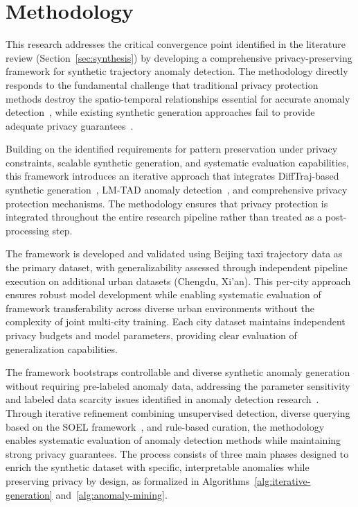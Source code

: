 \section{Methodology}
\label{sec:methodology}

This research addresses the critical convergence point identified in the literature review (Section~\ref{sec:synthesis}) by developing a comprehensive privacy-preserving framework for synthetic trajectory anomaly detection. The methodology directly responds to the fundamental challenge that traditional privacy protection methods destroy the spatio-temporal relationships essential for accurate anomaly detection~\cite{buchholzSystematisationKnowledgeTrajectory2024}, while existing synthetic generation approaches fail to provide adequate privacy guarantees~\cite{liuTrajGANsUsingGenerative2018}.

Building on the identified requirements for pattern preservation under privacy constraints, scalable synthetic generation, and systematic evaluation capabilities, this framework introduces an iterative approach that integrates DiffTraj-based synthetic generation~\cite{zhuDiffTrajGeneratingGPS2023}, LM-TAD anomaly detection~\cite{mbuyaTrajectoryAnomalyDetection2024}, and comprehensive privacy protection mechanisms. The methodology ensures that privacy protection is integrated throughout the entire research pipeline rather than treated as a post-processing step.

The framework is developed and validated using Beijing taxi trajectory data as the primary dataset, with generalizability assessed through independent pipeline execution on additional urban datasets (Chengdu, Xi'an). This per-city approach ensures robust model development while enabling systematic evaluation of framework transferability across diverse urban environments without the complexity of joint multi-city training. Each city dataset maintains independent privacy budgets and model parameters, providing clear evaluation of generalization capabilities.

The framework bootstraps controllable and diverse synthetic anomaly generation without requiring pre-labeled anomaly data, addressing the parameter sensitivity and labeled data scarcity issues identified in anomaly detection research~\cite{zhangIBATDetectingAnomalous2011}. Through iterative refinement combining unsupervised detection, diverse querying based on the SOEL framework~\cite{liDeepAnomalyDetection2023}, and rule-based curation, the methodology enables systematic evaluation of anomaly detection methods while maintaining strong privacy guarantees. The process consists of three main phases designed to enrich the synthetic dataset with specific, interpretable anomalies while preserving privacy by design, as formalized in Algorithms~\ref{alg:iterative-generation} and~\ref{alg:anomaly-mining}.

